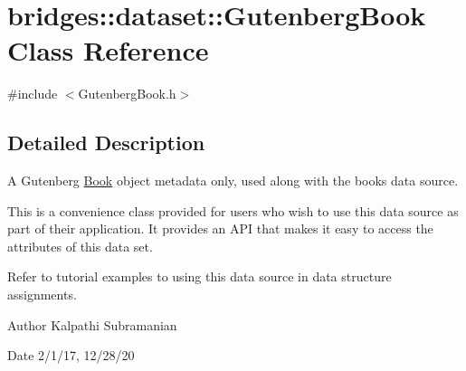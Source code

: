 \hypertarget{classbridges_1_1dataset_1_1_gutenberg_book}{}\section{bridges\+:\+:dataset\+:\+:Gutenberg\+Book Class Reference}
\label{classbridges_1_1dataset_1_1_gutenberg_book}


{\ttfamily \#include $<$Gutenberg\+Book.\+h$>$}



\subsection{Detailed Description}
A Gutenberg \hyperlink{classbridges_1_1dataset_1_1_book}{Book} object metadata only, used along with the books data source. 

This is a convenience class provided for users who wish to use this data source as part of their application. It provides an A\+PI that makes it easy to access the attributes of this data set.

Refer to tutorial examples to using this data source in data structure assignments.

\begin{DoxyAuthor}{Author}
Kalpathi Subramanian 
\end{DoxyAuthor}
\begin{DoxyDate}{Date}
2/1/17, 12/28/20 
\end{DoxyDate}
